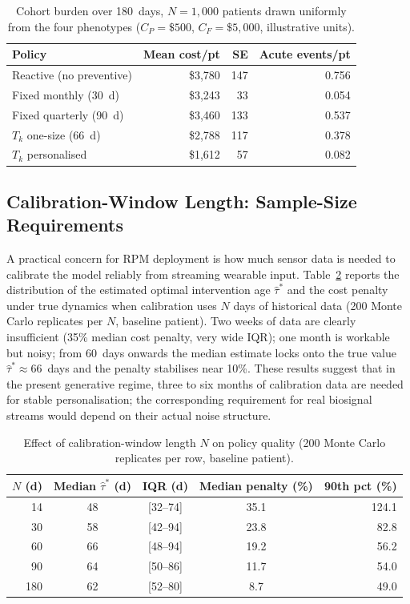 \documentclass[pdflatex,sn-mathphys-num]{sn-jnl}
\theoremstyle{definition}
\numberwithin{equation}{section}
\begin{document}
\begin{table}[htbp]
\centering
\caption{Cohort burden over 180~days, $N=1{,}000$ patients drawn uniformly from the four phenotypes ($C_P{=}\$500$, $C_F{=}\$5{,}000$, illustrative units).}
\label{tab:cohort}
\small
\begin{tabular}{lrrr}
\toprule
Policy & Mean cost/pt & SE & Acute events/pt \\
\midrule
Reactive (no preventive) & \$3{,}780 & 147 & 0.756 \\
Fixed monthly (30~d)     & \$3{,}243 &  33 & 0.054 \\
Fixed quarterly (90~d)   & \$3{,}460 & 133 & 0.537 \\
$T_k$ one-size (66~d)    & \$2{,}788 & 117 & 0.378 \\
$T_k$ personalised       & \$1{,}612 &  57 & 0.082 \\
\bottomrule
\end{tabular}
\end{table}

\subsection{Calibration-Window Length: Sample-Size Requirements}\label{sec:case_window}

A practical concern for RPM deployment is how much sensor data is needed to calibrate the model reliably from streaming wearable input. Table~\ref{tab:window} reports the distribution of the estimated optimal intervention age $\hat\tau^*$ and the cost penalty under true dynamics when calibration uses $N$ days of historical data (200 Monte Carlo replicates per $N$, baseline patient). Two weeks of data are clearly insufficient (35\% median cost penalty, very wide IQR); one month is workable but noisy; from 60~days onwards the median estimate locks onto the true value $\hat\tau^*\approx 66$~days and the penalty stabilises near 10\%. These results suggest that in the present generative regime, three to six months of calibration data are needed for stable personalisation; the corresponding requirement for real biosignal streams would depend on their actual noise structure.

\begin{table}[htbp]
\centering
\caption{Effect of calibration-window length $N$ on policy quality (200 Monte Carlo replicates per row, baseline patient).}
\label{tab:window}
\small
\begin{tabular}{rcccr}
\toprule
$N$ (d) & Median $\hat\tau^*$ (d) & IQR (d) & Median penalty (\%) & 90th pct (\%) \\
\midrule
14  & 48 & [32--74] & 35.1 & 124.1 \\
30  & 58 & [42--94] & 23.8 &  82.8 \\
60  & 66 & [48--94] & 19.2 &  56.2 \\
90  & 64 & [50--86] & 11.7 &  54.0 \\
180 & 62 & [52--80] &  8.7 &  49.0 \\
\bottomrule
\end{tabular}
\end{table}
\end{document}
